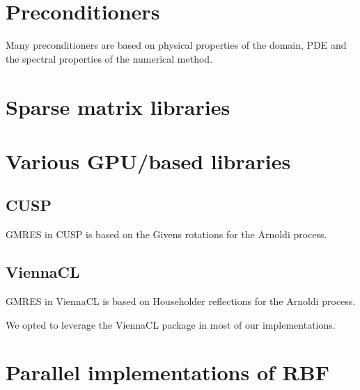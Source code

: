 \documentclass[11pt]{report}
\begin{document}
\section{  Preconditioners }

Many preconditioners are based on physical properties of the domain, PDE and the spectral properties of the numerical method. 

\section{   Sparse matrix libraries }
\section{  Various GPU/based libraries }

\subsection{CUSP}

GMRES in CUSP is based on the Givens rotations for the Arnoldi process. 

\subsection{ViennaCL}

GMRES in ViennaCL is based on Householder reflections for the Arnoldi process. 

We opted to leverage the ViennaCL package in most of our implementations. 

\section{  Parallel implementations of RBF}
\end{document}
